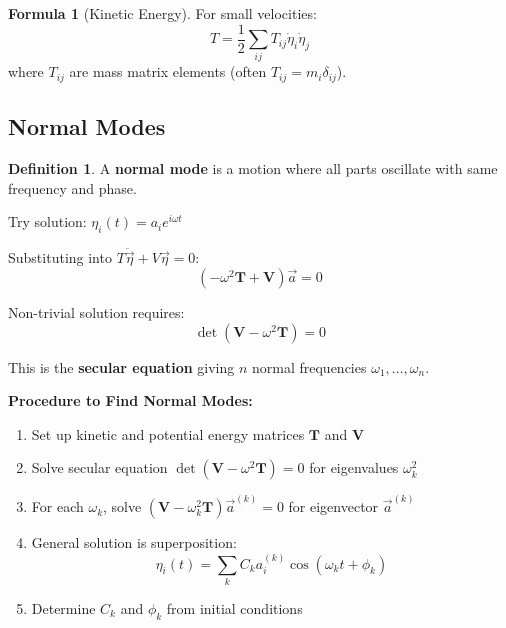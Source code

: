 \documentclass[12pt,a4paper]{article}
\theoremstyle{definition}
\newtheorem{definition}[theorem]{Definition}
\newtheorem{formula}[theorem]{Formula}
\begin{document}
\begin{formula}[Kinetic Energy]
For small velocities:
\[
T = \frac{1}{2}\sum_{ij} T_{ij}\dot{\eta}_i\dot{\eta}_j
\]
where $T_{ij}$ are mass matrix elements (often $T_{ij} = m_i\delta_{ij}$).
\end{formula}

\subsection{Normal Modes}

\begin{definition}
A \textbf{normal mode} is a motion where all parts oscillate with same frequency and phase.

Try solution: $\eta_i(t) = a_i e^{i\omega t}$

Substituting into $T\ddot{\vec{\eta}} + V\vec{\eta} = 0$:
\[
(-\omega^2 \mathbf{T} + \mathbf{V})\vec{a} = 0
\]

Non-trivial solution requires:
\[
\det(\mathbf{V} - \omega^2\mathbf{T}) = 0
\]

This is the \textbf{secular equation} giving $n$ normal frequencies $\omega_1, \ldots, \omega_n$.
\end{definition}

\begin{importantbox}
\textbf{Procedure to Find Normal Modes:}
\begin{enumerate}
    \item Set up kinetic and potential energy matrices $\mathbf{T}$ and $\mathbf{V}$
    \item Solve secular equation $\det(\mathbf{V} - \omega^2\mathbf{T}) = 0$ for eigenvalues $\omega_k^2$
    \item For each $\omega_k$, solve $(\mathbf{V} - \omega_k^2\mathbf{T})\vec{a}^{(k)} = 0$ for eigenvector $\vec{a}^{(k)}$
    \item General solution is superposition:
    \[
    \eta_i(t) = \sum_k C_k a_i^{(k)}\cos(\omega_k t + \phi_k)
    \]
    \item Determine $C_k$ and $\phi_k$ from initial conditions
\end{enumerate}
\end{importantbox}
\end{document}
